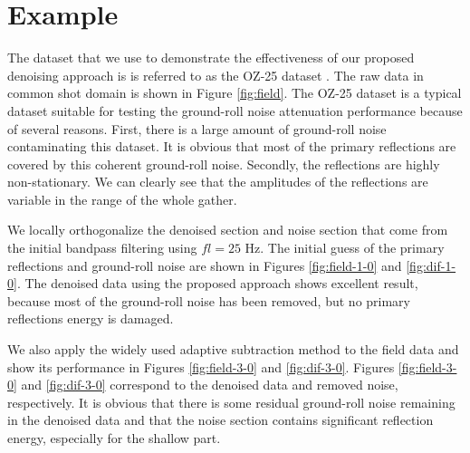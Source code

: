 \section{Example}
The dataset that we use to demonstrate the effectiveness of our proposed denoising approach is  is referred to as the OZ-25 dataset \cite{carson2006}.  The raw data in common shot domain is shown in Figure \ref{fig:field}.  The OZ-25 dataset is a typical dataset suitable for testing the ground-roll noise attenuation performance because of several reasons. First,  there is a large amount of ground-roll noise contaminating this dataset. It is obvious that most of the primary reflections are covered by this coherent ground-roll noise. Secondly, the reflections are highly non-stationary. We can clearly see that the amplitudes of the reflections are variable in the range of the whole gather. 

 We locally orthogonalize the denoised section and noise section that come from the initial bandpass filtering using $fl=25$ Hz. The initial guess of the primary reflections and ground-roll noise are shown in Figures \ref{fig:field-1-0} and \ref{fig:dif-1-0}.  The denoised data using the proposed approach shows excellent result, because most of the ground-roll noise has been removed, but no primary reflections energy is damaged. 

We also apply the widely used adaptive subtraction method to the field data and show its performance in Figures \ref{fig:field-3-0} and \ref{fig:dif-3-0}. Figures \ref{fig:field-3-0} and \ref{fig:dif-3-0} correspond to the denoised data and removed noise, respectively. It is obvious that there is some residual ground-roll noise remaining in the denoised data and that the noise section contains significant reflection energy, especially for the shallow part.

